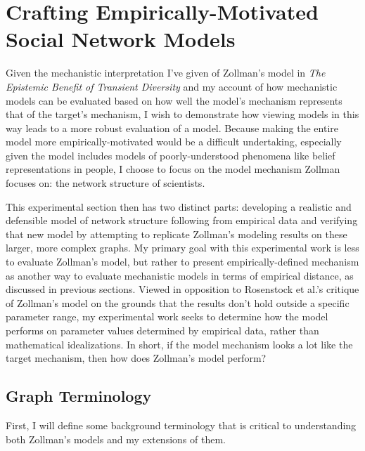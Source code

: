 \hypertarget{crafting-empirically-motivated-social-network-models}{%
\chapter{Crafting Empirically-Motivated Social Network
Models}\label{crafting-empirically-motivated-social-network-models}}

Given the mechanistic interpretation I've given of Zollman's model in
\emph{The Epistemic Benefit of Transient Diversity}
\autocite{zollmanEpistemicBenefitTransient2009} and my account of how
mechanistic models can be evaluated based on how well the model's
mechanism represents that of the target's mechanism, I wish to
demonstrate how viewing models in this way leads to a more robust
evaluation of a model. Because making the entire model more
empirically-motivated would be a difficult undertaking, especially given
the model includes models of poorly-understood phenomena like belief
representations in people, I choose to focus on the model mechanism
Zollman focuses on: the network structure of scientists.

This experimental section then has two distinct parts: developing a
realistic and defensible model of network structure following from
empirical data and verifying that new model by attempting to replicate
Zollman's modeling results on these larger, more complex graphs. My
primary goal with this experimental work is less to evaluate Zollman's
model, but rather to present empirically-defined mechanism as another
way to evaluate mechanistic models in terms of empirical distance, as
discussed in previous sections. Viewed in opposition to Rosenstock et
al.'s critique of Zollman's model on the grounds that the results don't
hold outside a specific parameter range, my experimental work seeks to
determine how the model performs on parameter values determined by
empirical data, rather than mathematical idealizations. In short, if the
model mechanism looks a lot like the target mechanism, then how does
Zollman's model perform?

\hypertarget{graph-terminology}{%
\section{Graph Terminology}\label{graph-terminology}}

First, I will define some background terminology that is critical to
understanding both Zollman's models and my extensions of them.

